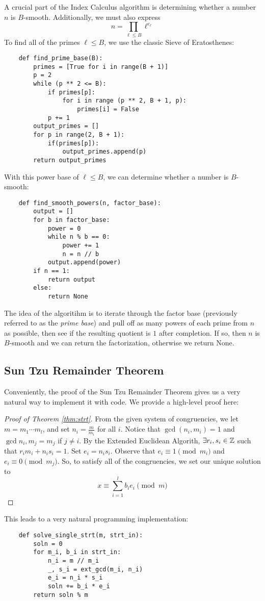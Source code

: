 \documentclass[]{math_paper}
\begin{document}
A crucial part of the Index Calculus algorithm is determining whether a number $n$ is $B$-smooth. Additionally, we must also express
\[
    n = \prod_{\ell \leq B}\ell^{e_\ell}
\]
To find all of the primes $\ell \leq B$, we use the classic Sieve of Eratosthenes:
\begin{lstlisting}
    def find_prime_base(B):
        primes = [True for i in range(B + 1)]
        p = 2
        while (p ** 2 <= B):
            if primes[p]: 
                for i in range (p ** 2, B + 1, p):
                    primes[i] = False
            p += 1
        output_primes = []
        for p in range(2, B + 1):
            if(primes[p]):
                output_primes.append(p)
        return output_primes
\end{lstlisting}
With this power base of $\ell \leq B$, we can determine whether a number is $B$-smooth:
\begin{lstlisting}
    def find_smooth_powers(n, factor_base):
        output = []
        for b in factor_base:
            power = 0
            while n % b == 0:
                power += 1
                n = n // b
            output.append(power)
        if n == 1: 
            return output
        else:
            return None
\end{lstlisting}
The idea of the algoritihm is to iterate through the factor base (previously referred to as the \emph{prime base}) and pull off as many powers of each prime from $n$ as possible, then see if the resulting quotient is $1$ after completion. If so, then $n$ is $B$-smooth and we can return the factorization, otherwise we return None.
\subsection{Sun Tzu Remainder Theorem} \label{subsec:strt}
Conveniently, the proof of the Sun Tzu Remainder Theorem gives us a very natural way to implement it with code. We provide a high-level proof here:
\begin{proof}[Proof of Theorem \ref{thm:strt}] \cite{Vogt}
    From the given system of congruencies, we let $m = m_1 \cdots m_l$, and set $n_i = \frac{m}{m_i}$ for all $i$. Notice that $\gcd(n_i, m_i) = 1$ and $\gcd{n_i, m_j} = m_j$ if $j \neq i$. By the Extended Euclidean Algorith, $\exists r_i, s_i \in \mathbb{Z}$ such that $r_i m_i + n_i s_i = 1$. Set $e_i = n_is_i$. Observe that $e_i \equiv 1 \pmod{m_i}$ and $e_i \equiv 0 \pmod{m_j}$. So, to satisfy all of the congruencies, we set our unique solution to
    \[
        x \equiv \sum_{i=1}^lb_ie_i \pmod m
    \]
\end{proof}
This leads to a very natural programming implementation:
\begin{lstlisting}
    def solve_single_strt(m, strt_in):
        soln = 0
        for m_i, b_i in strt_in:
            n_i = m // m_i
            _, s_i = ext_gcd(m_i, n_i)
            e_i = n_i * s_i
            soln += b_i * e_i
        return soln % m
\end{lstlisting}
\end{document}
